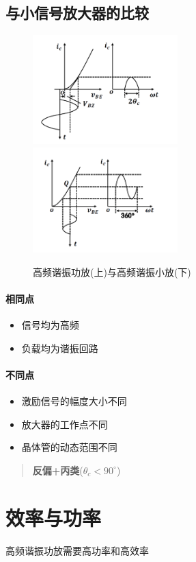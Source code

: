 \documentclass[a4paper]{report}
\begin{document}
\subsection{与小信号放大器的比较}
\begin{figure}[H]
\centering
\includegraphics[width=0.5\textwidth]{power_amp_graph_1.png}
\includegraphics[width=0.5\textwidth]{power_amp_graph_2.png}
\caption{高频谐振功放(上)与高频谐振小放(下)}
\end{figure}
\paragraph{相同点}
\begin{itemize}
  \item 信号均为高频
  \item 负载均为谐振回路
\end{itemize}
\paragraph{不同点}
\begin{itemize}
  \item 激励信号的幅度大小不同
  \item 放大器的工作点不同
  \item 晶体管的动态范围不同
\end{itemize}
\begin{quote}
  \centering
  \textbf{反偏+丙类}($\theta_c<90^\circ$)
\end{quote}
\section{效率与功率}
高频谐振功放需要高功率和高效率
\end{document}
